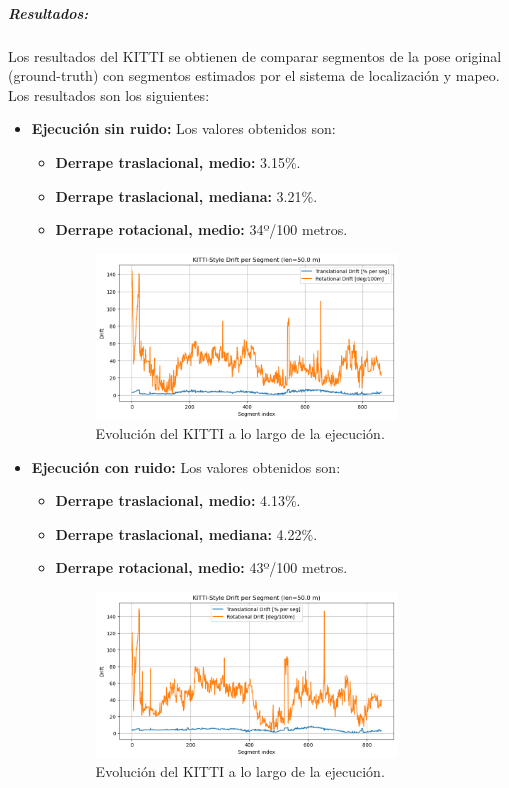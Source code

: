 \documentclass[12pt, a4paper, twoside]{article}
\begin{document}
\subparagraph{Resultados:}
Los resultados del KITTI\cite{Geiger2013KITTI} se obtienen de comparar segmentos de la pose original (ground-truth) con segmentos estimados por el sistema de localización y mapeo. 
Los resultados son los siguientes:
\begin{itemize}
  \item \textbf{Ejecución sin ruido:} Los valores obtenidos son:
  \begin{itemize}
    \item \textbf{Derrape traslacional, medio:} 3.15\%.
    \item \textbf{Derrape traslacional, mediana:} 3.21\%.
    \item \textbf{Derrape rotacional, medio:} 34º/100 metros.
    \begin{figure}[h]
      \centering
        \includegraphics[width=0.8\textwidth]{kitty_clean.png}
      \caption{Evolución del KITTI\cite{Geiger2013KITTI} a lo largo de la ejecución.}
    \end{figure} 
    \end{itemize}
  \item \textbf{Ejecución con ruido:} Los valores obtenidos son:
  \begin{itemize}
    \item \textbf{Derrape traslacional, medio:} 4.13\%.
    \item \textbf{Derrape traslacional, mediana:} 4.22\%.
    \item \textbf{Derrape rotacional, medio:} 43º/100 metros.
    \begin{figure}[h]
      \centering
        \includegraphics[width=0.8\textwidth]{kitty_noisy.png}
      \caption{Evolución del KITTI\cite{Geiger2013KITTI} a lo largo de la ejecución.}
    \end{figure}\newpage
  \end{itemize}
\end{itemize}
\end{document}
